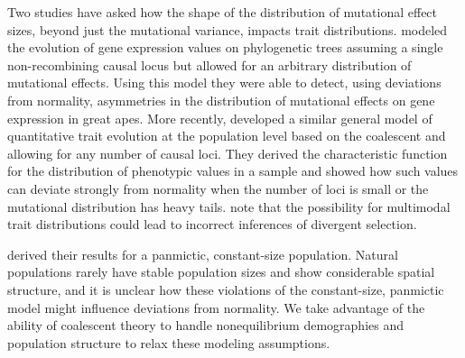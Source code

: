 Two studies have asked how the shape of the distribution of mutational effect
sizes, beyond just the mutational variance, impacts trait
distributions. \citet{Khaitovich2005} modeled the evolution of gene expression
values on phylogenetic trees assuming a single non-recombining causal locus but
allowed for an arbitrary distribution of mutational effects. Using this model
they were able to detect, using deviations from normality, asymmetries in the
distribution of mutational effects on gene expression in great apes. More
recently, \citet{Schraiber2015} developed a similar general model of
quantitative trait evolution at the population level based on the coalescent and
allowing for any number of causal loci. They derived the characteristic function
for the distribution of phenotypic values in a sample and showed how such values
can deviate strongly from normality when the number of loci is small or the
mutational distribution has heavy tails. \citet{Schraiber2015} note that the
possibility for multimodal trait distributions could lead to incorrect
inferences of divergent selection.

\citet{Schraiber2015} derived their results for a panmictic, constant-size
population. Natural populations rarely have stable population sizes and show
considerable spatial structure, and it is unclear how these violations of the
constant-size, panmictic model might influence deviations from normality. We
take advantage of the ability of coalescent theory to handle nonequilibrium
demographies and population structure to relax these modeling assumptions.

